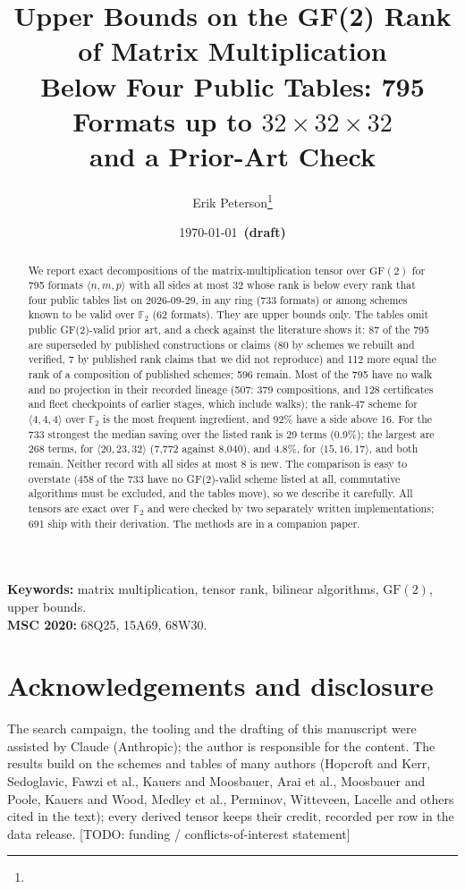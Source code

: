 \documentclass[11pt]{article}
\title{Upper Bounds on the GF(2) Rank of Matrix Multiplication\\
Below Four Public Tables: 795 Formats up to $32\times32\times32$\\
and a Prior-Art Check}
\author{Erik Peterson\thanks{\todo{affiliation and contact e-mail}}}
\date{\today\ \textbf{(draft)}}
\newcommand{\F}{{\mathbb{F}_2}}
\newcommand{\MM}[3]{\langle #1,#2,#3\rangle}
\newcommand{\todo}[1]{{\color{red}[TODO: #1]}}
\begin{document}
\maketitle

\begin{abstract}
We report exact decompositions of the matrix-multiplication tensor over $\mathrm{GF}(2)$ for 795 formats $\MM nmp$ with all sides at most 32 whose rank is below every rank that four public tables list on 2026-09-29, in any ring (733 formats) or among schemes known to be valid over $\F$ (62 formats). They are upper bounds only.
The tables omit public GF(2)-valid prior art, and a check against the literature shows it: 87 of the 795 are superseded by published constructions or claims (80 by schemes we rebuilt and verified, 7 by published rank claims that we did not reproduce) and 112 more equal the rank of a composition of published schemes; 596 remain.
Most of the 795 have no walk and no projection in their recorded lineage (507: 379 compositions, and 128 certificates and fleet checkpoints of earlier stages, which include walks); the rank-47 scheme for $\MM444$ over $\F$ is the most frequent ingredient, and 92\% have a side above 16.
For the 733 strongest the median saving over the listed rank is 29 terms (0.9\%); the largest are 268 terms, for $\MM{20}{23}{32}$ (7{,}772 against 8{,}040), and 4.8\%, for $\MM{15}{16}{17}$, and both remain. Neither record with all sides at most 8 is new.
The comparison is easy to overstate (458 of the 733 have no GF(2)-valid scheme listed at all, commutative algorithms must be excluded, and the tables move), so we describe it carefully.
All tensors are exact over $\F$ and were checked by two separately written implementations; 691 ship with their derivation. The methods are in a companion paper.
\end{abstract}

\noindent\textbf{Keywords:} matrix multiplication, tensor rank, bilinear algorithms, $\mathrm{GF}(2)$, upper bounds.\\
\textbf{MSC 2020:} 68Q25, 15A69, 68W30.











\section*{Acknowledgements and disclosure}
The search campaign, the tooling and the drafting of this manuscript were assisted by Claude (Anthropic); the author is responsible for the content.
The results build on the schemes and tables of many authors (Hopcroft and Kerr, Sedoglavic, Fawzi et al., Kauers and Moosbauer, Arai et al., Moosbauer and Poole, Kauers and Wood, Medley et al., Perminov, Witteveen, Lacelle and others cited in the text); every derived tensor keeps their credit, recorded per row in the data release.
\todo{funding / conflicts-of-interest statement}
\end{document}
